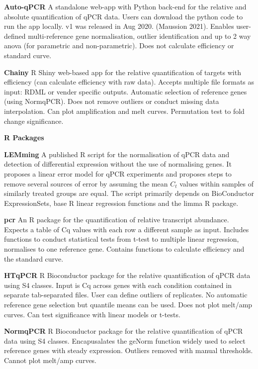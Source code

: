 \documentclass{SBCbookchapter}
\begin{document}
\textbf{Auto-qPCR} A standalone web-app with Python back-end for the relative and absolute quantification of qPCR data. Users can download the python code to run the app locally. v1 was released in Aug 2020. (Maussion 2021). Enables user-defined multi-reference gene normalisation, outlier identification and up to 2 way anova (for parametric and non-parametric). Does not calculate efficiency or standard curve. \cite{Maussion2021}

\textbf{Chainy} R Shiny web-based app for the relative quantification of targets with efficiency (can calculate efficiency with raw data). Accepts multiple file formats as input: RDML or vender specific outputs. Automatic selection of reference genes (using NormqPCR). Does not remove outliers or conduct missing data interpolation. Can plot amplification and melt curves. Permutation test to fold change significance. \cite{Mallona2017}

\textbf{R Packages}

\textbf{LEMming} A published R script for the normalisation of qPCR data and detection of differential expression without the use of normalising genes. It proposes a linear error model for qPCR experiments and proposes steps to remove several sources of error by assuming the mean $C_t$ values within samples of similarly treated groups are equal. The script primarily depends on BioConductor ExpressionSets, base R linear regression functions and the limma R package. \cite{Feuer2015}

\textbf{pcr} An R package for the quantification of relative transcript abundance. Expects a table of Cq values with each row a different sample as input. Includes functions to conduct statistical tests from t-test to multiple linear regression, normalises to one reference gene. Contains functions to calculate efficiency and the standard curve. \cite{Ahmed2018}

\textbf{HTqPCR} R Bioconductor package for the relative quantification of qPCR data using S4 classes. Input is Cq across genes with each condition contained in separate tab-separated files. User can define outliers of replicates. No automatic reference gene selection but quantile means can be used. Does not plot melt/amp curves. Can test significance with linear models or t-tests. \cite{Dvinge2009}

\textbf{NormqPCR}  R Bioconductor package for the relative quantification of qPCR data using S4 classes. Encapusalates the geNorm function widely used to select reference genes with steady expression. Outliers removed with manual thresholds. Cannot plot melt/amp curves. \cite{Perkins2012}
\end{document}
